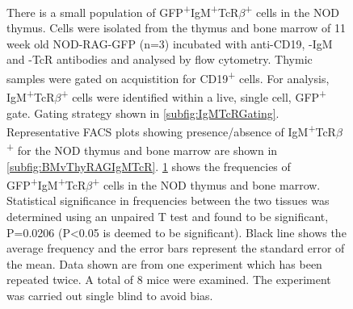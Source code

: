 \begin{figure}
\begin{subfigure}{0.5\textwidth}
	\label{subfig:IgMTcRposgraph}
	\end{subfigure}
\caption[There is a small population of IgM\textsuperscript{+}TcR$\beta$\textsuperscript{+} cells in the NOD thymus]{There is a small population of GFP\textsuperscript{+}IgM\textsuperscript{+}TcR$\beta$\textsuperscript{+} cells in the NOD thymus. 
Cells were isolated from the thymus and bone marrow of 11 week old NOD-RAG-GFP (n=3) incubated with anti-CD19, -IgM and -TcR antibodies and analysed by flow cytometry.
Thymic samples were gated on acquistition for CD19\textsuperscript{+} cells.
For analysis, IgM\textsuperscript{+}TcR$\beta$\textsuperscript{+} cells were identified within a live, single cell, GFP\textsuperscript{+} gate. Gating strategy shown in \ref{subfig:IgMTcRGating}.
Representative FACS plots showing presence/absence of IgM\textsuperscript{+}TcR$\beta$\textsuperscript{+} for the NOD thymus and bone marrow are shown in \ref{subfig:BMvThyRAGIgMTcR}.
\ref{subfig:IgMTcRposgraph} shows the frequencies of GFP\textsuperscript{+}IgM\textsuperscript{+}TcR$\beta$\textsuperscript{+} cells in the NOD thymus and bone marrow.
Statistical significance in frequencies between the two tissues was determined using an unpaired T test and found to be significant, P=0.0206 (P<0.05 is deemed to be significant). Black line shows the average frequency and the error bars represent the standard error of the mean. 
Data shown are from one experiment which has been repeated twice. A total of 8 mice were examined.
The experiment was carried out single blind to avoid bias.}
\label{fig:RAGIgMTcRpos}
\end{figure}





